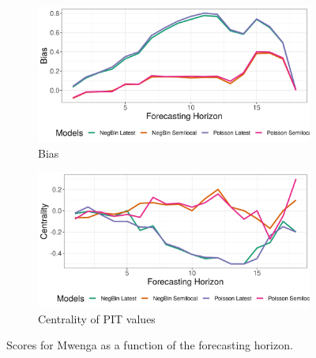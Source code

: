 \begin{figure}[H]
\begin{subfigure}{0.5\textwidth}
  \centering
  \includegraphics[width=\linewidth]{../output/Mwenga_bias.png}  
  \caption{Bias}
  \label{fig:Mwenga_scores_3}
\end{subfigure}
\begin{subfigure}{0.5\textwidth}
  \centering
  \includegraphics[width=\linewidth]{../output/Mwenga_centrality.png}  
  \caption{Centrality of PIT values}
  \label{fig:Mwenga_scores_4}
\end{subfigure}
  \caption{Scores for Mwenga as a function of the forecasting horizon.}

  \label{fig:nat_scores}
\end{figure}
